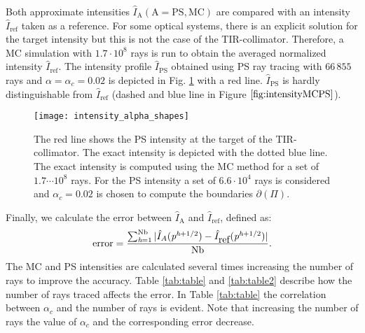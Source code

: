 Both approximate intensities $\hat{I}_{\textrm{A}} (\textrm{A} = \textrm{PS}, \textrm{MC})$ are compared with an intensity $\hat{I}_{\textrm{ref}}$ taken as a reference. For some optical systems, there is an explicit solution for the target intensity but this is not the case of the TIR-collimator.
Therefore, a MC simulation with $1.7 \cdot 10^8$ rays is run to obtain the averaged normalized intensity $\hat{I}_{\textrm{ref}}$.
The intensity profile $\hat{I}_{\textrm{PS}}
$ obtained using PS ray tracing with $66\,855$ rays and $\alpha= \alpha_c = 0.02$ is depicted in Fig. \ref{fig:intensityMCPS} with a red line.
$\hat{I}_{\textrm{PS}}$ is hardly distinguishable from $\hat{I}_{\textrm{ref}}$ (dashed and blue line in Figure $\ref{fig:intensityMCPS}$).\\ \indent
  \begin{figure}[h]
    \centering
    \texttt{[image: intensity\_alpha\_shapes]}
\caption{The red line shows the PS intensity at the target of the TIR-collimator. The exact intensity is depicted with the dotted blue line.
The exact intensity is computed using the MC method for a set of $1.7\cdots 10^8$ rays. For the PS intensity a set of $6.6\cdot 10^4$
rays is considered and $\alpha_c = 0.02$ is chosen to compute the boundaries $\partial$$(\Pi)$.}%
  \label{fig:intensityMCPS}
\end{figure}
Finally, we calculate the error between $\hat{I}_{\textrm{A}}$ and $\hat{I}_{\textrm{ref}}$, defined as:
\begin{equation}\label{eq:error}
\mbox{error} = \frac{\sum_{\textit{h}= 1}^{\textrm{Nb}}| \hat{I}_{A}(\textit{p}^{\textit{h}+1/2}) - \hat{I}_{\mbox{ref}}(\textit{p}^{\textit{h}+1/2})|}{\textrm{Nb}}.
\end{equation}
The MC and PS intensities are calculated several times increasing the number of rays to improve the accuracy.
Table \ref{tab:table} and \ref{tab:table2} describe how the number of rays traced affects the error. 
In Table \ref{tab:table} the correlation between $\alpha_c$ and the number of rays is evident.
Note that increasing the number of rays the value of $\alpha_c$ and the corresponding error decrease. 
